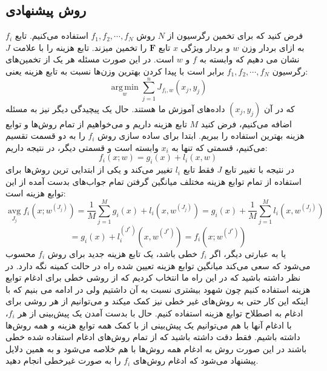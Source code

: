 \documentclass[12pt,a4paper,BCOR=.7cm,headsepline,bibliography=totoc]{report}
\begin{document}
\subsection{روش پیشنهادی}
فرض کنید که برای تخمین رگرسیون از $N$ روش $f_1, f_2, \cdots, f_N $ استفاده می‌کنیم. تابع $f_i$ به ازای بردار وزن $w$ و بردار ویژگی $x$ تابع $\mathbf{F}$ را تخمین میزند. تابع هزینه را با علامت $J$ نشان می دهیم که وابسته به $f$ و $w$ است. در این صورت مسئله هر یک از تخمین‌های رگرسیون  $f_1, f_2, \cdots, f_N $ برابر است با پیدا کردن بهترین وزن‌ها نسبت به تابع هزینه یعنی:
$$
{\underset {w }{\operatorname {arg\,min}}} \sum _{j=1}^{n} J_{f_i,w}(x_j,y_j)
$$
که در آن $(x_j,y_j)$ داده‌های آموزش ما هستند. حال یک پیچیدگی دیگر نیز به مسئله اضافه می‌کنیم، فرض کنید $M$ تابع هزینه داریم و می‌خواهیم از تمام روش‌ها و توابع هزینه بهترین استفاده را ببریم. ابتدا برای ساده سازی روش $f_i$ را به دو قسمت تقسیم می‌کنیم، قسمتی که تنها به $x_i$ وابسته است و قسمتی دیگر،‌ در نتیجه داریم:
$$
f_i(x;w)=g_i(x)+l_i(x,w)
$$
در نتیجه با تغییر تابع $J$ فقط تابع $l_i$ تغییر می‌کند و یکی از ابتدایی ترین روش‌ها برای استفاده از تمام توابع هزینه مختلف میانگین گرفتن تمام جواب‌های بدست آمده از این توابع هزینه است:
$$
{\underset{J_j}{\operatorname{avg}}}f_i(x;w^{(J_j)}) = \frac{1}{M}\sum\limits_{j=1}^{M} g_i(x)+l_i(x,w^{(J_j)}) = g_i(x) + \frac{1}{M}\sum\limits_{j=1}^{M}l_i(x,w^{(J_j)})
$$
$$
= g_i(x) + l^{(J^*)}_i(x,w^{(J^*)}) = f_i(x;w^{(J^*)})
$$
یا به عبارتی دیگر، اگر $f_i$ خطی باشد، یک تابع هزینه جدید برای روش $f_i$ محسوب می‌شود که سعی می‌کند میانگین توابع هزینه تعیین شده راه در حالت کمینه نگه دارد. در نظر داشته باشید که در این راه ما انتخاب کردیم که از روشی خطی برای ادغام توابع هزینه استفاده کنیم چون شهود بیشتری نسبت به آن داشتیم ولی در ادامه می ‌بنیم که با اینکه این کار حتی به روش‌های غیر خطی نیز کمک میکند و می‌توانیم از هر روشی برای ادغام به اصطلاح توابع هزینه استفاده کنیم. حال با بدست آمدن یک پیش‌بینی از هر $f_i$، با ادغام آنها با هم می‌توانیم یک پیش‌بینی از با کمک همه توابع هزینه و همه روش‌ها داشته باشیم. فقط دقت داشته باشید که از تمام روش‌های ادغام استفاده شده خطی باشند در این صورت روش به ادغام همه روش‌ها با هم خلاصه می‌شود و به همین دلایل پیشنهاد می‌شود که ادغام روش‌های $f_i$ را به صورت غیرخطی انجام دهید.
\end{document}
